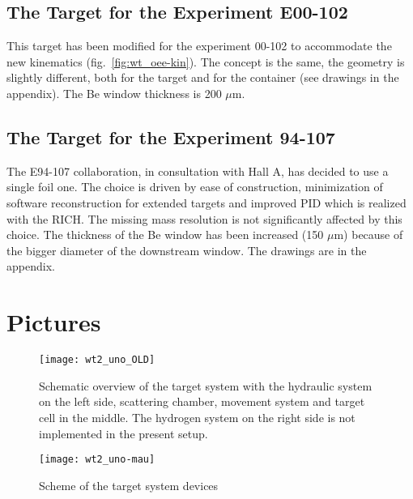 \subsection{The Target for the Experiment E00-102}

This target has been modified for the experiment 00-102 to accommodate
the new kinematics (fig.~\ref{fig:wt_oee-kin}). The concept is the same,
the geometry is slightly different, both for the target and for the
container (see drawings in the appendix). The Be window thickness
is 200 $\mu $m.


\subsection{The Target for the Experiment 94-107}

The E94-107 collaboration, in consultation with Hall A, has decided
to use a single foil one. The choice is driven by ease of construction,
minimization of software reconstruction for extended targets and improved
PID which is realized with the RICH. The missing mass resolution is
not significantly affected by this choice. The thickness of the Be
window has been increased (150 $\mu $m) because of the bigger diameter
of the downstream window. The drawings are in the appendix. 


\section{Pictures}

%
\begin{figure}
\begin{center}\texttt{[image: wt2\_uno\_OLD]}\end{center}


\caption{Schematic overview of the target system with the hydraulic system
on the left side, scattering chamber, movement system and target cell
in the middle. The hydrogen system on the right side is not implemented
in the present setup.}

\label{fig:wt_uno}
\end{figure}


%
\begin{figure}
\begin{center}\texttt{[image: wt2\_uno-mau]}\end{center}


\caption{Scheme of the target system devices}

\label{fig:wt_uno-mau}
\end{figure}


